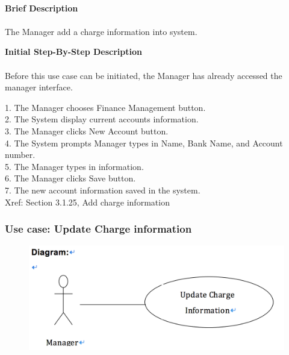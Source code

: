\documentclass[12pt]{report}
\begin{document}
\paragraph{}
\begin{flushleft}
\textbf{Brief Description }
\paragraph{}
The Manager add a charge information into system. \\

\begin{flushleft}
\textbf{Initial Step-By-Step Description }
\paragraph{}
Before this use case can be initiated, the Manager has already accessed the manager interface.

\begin{flushleft}
1.	The Manager chooses Finance Management button. \\
2.	The System display current accounts information. \\
3.	The Manager clicks New Account button. \\
4.	The System prompts Manager types in Name, Bank Name, and Account number. \\
5.	The Manager types in information. \\
6.	The Manager clicks Save button. \\
7.	The new account information saved in the system. \\
Xref: Section 3.1.25, Add charge information
\end{flushleft}
\end{flushleft}
\end{flushleft}

\newpage
\subsubsection{Use case:  Update Charge information }

\begin{figure}[!htb]
  \includegraphics{212.PNG}
\end{figure}
\end{document}
